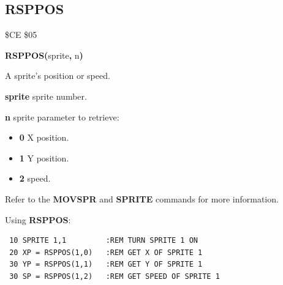 \subsection{RSPPOS}
\begin{description}[leftmargin=2cm,style=nextline]
\item [Token:] \$CE \$05
\item [Format:] {\bf RSPPOS(}sprite{\bf,} n{\bf)}
\item [Returns:]  A sprite's position or speed.

                {\bf sprite} sprite number.

                {\bf n} sprite parameter to retrieve:

                \begin{itemize}
                    \item {\bf 0} X position.
                    \item {\bf 1} Y position.
                    \item {\bf 2} speed.
                \end{itemize}

\item [Remarks:] Refer to the {\bf MOVSPR} and {\bf SPRITE} commands for more information.

\item [Example:] Using {\bf RSPPOS}:
\begin{tcolorbox}[colback=black,coltext=white]
\verbatimfont{\codefont}
\begin{verbatim}
 10 SPRITE 1,1         :REM TURN SPRITE 1 ON
 20 XP = RSPPOS(1,0)   :REM GET X OF SPRITE 1
 30 YP = RSPPOS(1,1)   :REM GET Y OF SPRITE 1
 30 SP = RSPPOS(1,2)   :REM GET SPEED OF SPRITE 1
\end{verbatim}
\end{tcolorbox}
\end{description}


\newpage
